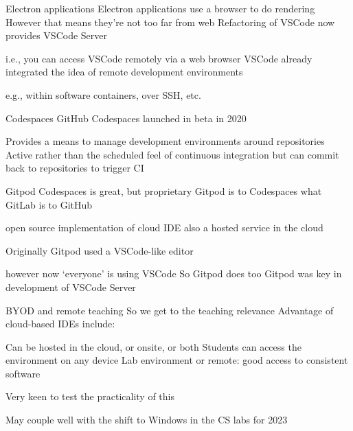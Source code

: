 \documentclass[aspectratio=169,t]{beamer}
\begin{document}
\begin{dframe}{Electron applications}
  \1 Electron applications use a browser to do rendering
  \1 However that means they're not too far from web
  \1 Refactoring of VSCode now provides VSCode Server
  
  \2 i.e., you can access VSCode remotely via a web browser
  \2 VSCode already integrated the idea of remote development environments

  \3 e.g., within software containers, over SSH, etc.
\end{dframe}

\begin{dframe}{Codespaces}
  \1 GitHub Codespaces launched in beta in 2020 %

  \2 Provides a means to manage development environments around repositories
  \2 Active rather than the scheduled feel of continuous integration
  \2 but can commit back to repositories to trigger CI

\end{dframe}

\begin{dframe}{Gitpod}
  \1 Codespaces is great, but proprietary
  \1 Gitpod is to Codespaces what GitLab is to GitHub
  
  \2 open source implementation of cloud IDE
  \2 also a hosted service in the cloud

  \1 Originally Gitpod used a VSCode-like editor

  \2 however now `everyone' is using VSCode
  \2 So Gitpod does too
  \2 Gitpod was key in development of VSCode Server
\end{dframe}

\begin{dframe}{BYOD and remote teaching}
  \1 So we get to the teaching relevance
  \1 Advantage of cloud-based IDEs include:
  
  \2 Can be hosted in the cloud, or onsite, or both
  \2 Students can access the environment on any device
  \2 Lab environment or remote: good access to consistent software

  \1 Very keen to test the practicality of this
  
  \2 May couple well with the shift to Windows in the CS labs for 2023
\end{dframe}

\begin{comment}
\begin{dframe}{FaaS, serverless and responsiveness}
  \1 Edge appearance
\end{dframe}
\end{comment}
\end{document}
